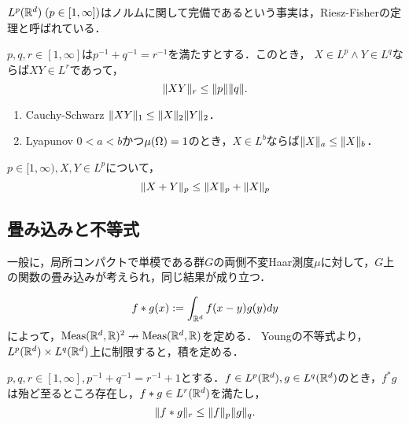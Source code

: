 \documentclass[uplatex,dvipdfmx]{jsreport}
\begin{document}
\begin{tcolorbox}[colframe=ForestGreen, colback=ForestGreen!10!white,breakable,colbacktitle=ForestGreen!40!white,coltitle=black,fonttitle=\bfseries\sffamily,
title=]
    $L^p(\mathbb{R}^d)\;(p\in[1,\infty])$はノルムに関して完備であるという事実は，Riesz-Fisherの定理と呼ばれている．
\end{tcolorbox}

\begin{proposition}[Holder]
    $p,q,r\in[1,\infty]$は$p^{-1}+q^{-1}=r^{-1}$を満たすとする．このとき，
    $X\in L^p\land Y\in L^q$ならば$XY\in L^r$であって，
    \[\|XY\|_r\le\|p\|\|q\|.\]
\end{proposition}

\begin{corollary}\mbox{}
    \begin{enumerate}
        \item Cauchy-Schwarz $\|XY\|_1\le\|X\|_2\|Y\|_2$．
        \item Lyapunov $0<a<b$かつ$\mu(\Omega)=1$のとき，$X\in L^b$ならば$\|X\|_a\le\|X\|_b$．
    \end{enumerate}
\end{corollary}

\begin{proposition}[Minkowski]
    $p\in[1,\infty),X,Y\in L^p$について，
    \[\|X+Y\|_p\le\|X\|_p+\|X\|_p\]
\end{proposition}

\subsection{畳み込みと不等式}

\begin{notation}
    一般に，局所コンパクトで単模である群$G$の両側不変Haar測度$\mu$に対して，$G$上の関数の畳み込みが考えられ，同じ結果が成り立つ．
\end{notation}

\begin{definition}
    \[f*g(x):=\int_{\mathbb{R}^d}f(x-y)g(y)dy\]
    によって，$\mathrm{Meas}(\mathbb{R}^d,\mathbb{R})^2\nrightarrow\mathrm{Meas}(\mathbb{R}^d,\mathbb{R})$を定める．
    Youngの不等式より，$L^p(\mathbb{R}^d)\times L^q(\mathbb{R}^d)$上に制限すると，積を定める．
\end{definition}

\begin{proposition}[Young]
    $p,q,r\in[1,\infty],p^{-1}+q^{-1}=r^{-1}+1$とする．$f\in L^p(\mathbb{R}^d),g\in L^q(\mathbb{R}^d)$のとき，$f^*g$は殆ど至るところ存在し，$f*g\in L^r(\mathbb{R}^d)$を満たし，
    \[\|f*g\|_r\le\|f\|_p\|g\|_q.\]
\end{proposition}
\end{document}
